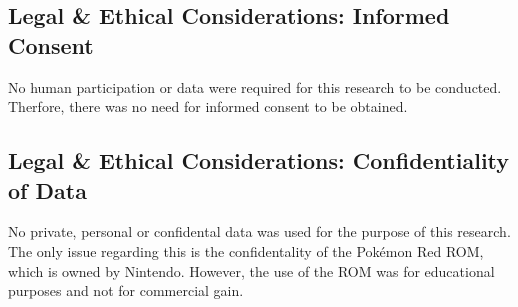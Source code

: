 \subsection{Legal \& Ethical Considerations: Informed Consent}

No human participation or data were required for this research to be conducted. Therfore, there was no need for informed consent to be obtained. 

\subsection{Legal \& Ethical Considerations: Confidentiality of Data}

No private, personal or confidental data was used for the purpose of this research. The only issue regarding this is the confidentality of the Pokémon Red ROM, which is owned by Nintendo. However, the use of the ROM was for educational purposes and not for commercial gain.